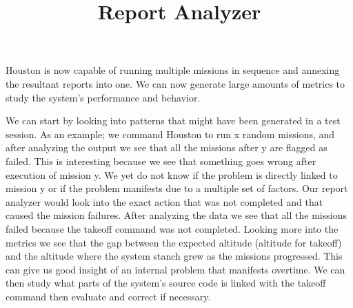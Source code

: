 \documentclass[11pt, a4paper]{article}
\begin{document}
\title{Report Analyzer}
\maketitle


\begin{large}
Houston is now capable of running multiple missions in sequence and annexing the resultant reports into one. We can now generate large amounts of metrics to study the system's performance and behavior. 

We can start by looking into patterns that might have been generated in a test session. As an example; we command Houston to run x random missions, and after analyzing the output we see that all the missions after y are flagged as failed. This is interesting because we see that something goes wrong after execution of mission y. We yet do not know if the problem is directly linked to mission y or if the problem manifests due to a multiple set of factors. Our report analyzer would look into the exact action that was not completed and that caused the mission failures. After analyzing the data we see that all the missions failed because the takeoff command was not completed. Looking more into the metrics we see that the gap between the expected altitude (altitude for takeoff) and the altitude where the system stanch grew as the missions progressed. This can give us good insight of an internal problem that manifests overtime. We can then study what parts of the system's source code is linked with the takeoff command then evaluate and correct if necessary.  


\end{large}
\end{document}
